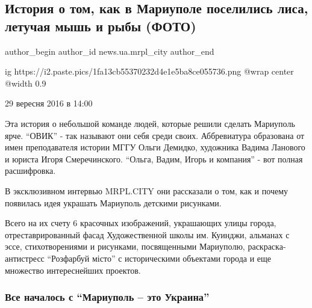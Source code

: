  
 
 
 
 
 
\subsection{История о том, как в Мариуполе поселились лиса, летучая мышь и рыбы (ФОТО)}
\label{sec:29_09_2016.stz.news.ua.mrpl_city.1.ovik}
 
\ifcmt
 author_begin
   author_id news.ua.mrpl_city
 author_end
\fi

\ifcmt
  ig https://i2.paste.pics/1fa13cb55370232d4e1e5ba8ce055736.png
  @wrap center
  @width 0.9
\fi

29 вересня 2016 в 14:00

Эта история о небольшой команде людей, которые решили сделать Мариуполь ярче.
\enquote{ОВИК} - так называют они себя среди своих. Аббревиатура образована от имен
преподавателя истории МГГУ Ольги Демидко, художника Вадима Ланового и юриста
Игоря Смеречинского. \enquote{Ольга, Вадим, Игорь и компания} - вот полная расшифровка.

В эксклюзивном интервью MRPL.CITY они рассказали о том, как и почему появилась
идея украшать Мариуполь детскими рисунками. 


Всего на их счету 6 красочных изображений, украшающих улицы города,
отреставрированный фасад Художественной школы им. Куинджи, альманах с эссе,
стихотворениями и рисунками, посвященными Мариуполю, раскраска-антистресс
\enquote{Розфарбуй місто} с историческими объектами города и еще множество
интереснейших проектов.


\subsubsection{Все началось с \enquote{Мариуполь – это Украина}}

